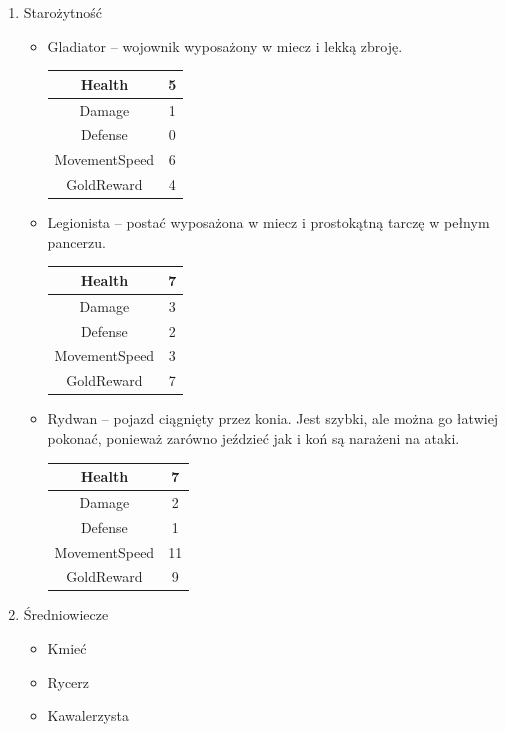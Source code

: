 \documentclass[a4paper,12pt, twoside, titlepage]{article}
\begin{document}
\begin{enumerate}
	\item Starożytność
	\begin{itemize} 
		\item Gladiator -- wojownik wyposażony w miecz i lekką zbroję.
		\begin{longtable}[l]{|c|c|} 
			\hline
			Health & 5 \\
			\hline
			Damage & 1 \\ 
			\hline 
			Defense & 0 \\ 
			\hline
			MovementSpeed & 6 \\ 
			\hline
			GoldReward & 4 \\ 
			\hline
		\end{longtable}
		
		\item Legionista -- postać wyposażona w miecz i prostokątną tarczę w pełnym pancerzu.
		\begin{longtable}[l]{|c|c|} 
			\hline
			Health & 7 \\
			\hline
			Damage & 3 \\ 
			\hline 
			Defense & 2 \\ 
			\hline
			MovementSpeed & 3 \\ 
			\hline
			GoldReward & 7 \\ 
			\hline
		\end{longtable}
		
		\item Rydwan -- pojazd ciągnięty przez konia. Jest szybki, ale można go łatwiej pokonać, ponieważ zarówno jeździeć jak i koń są narażeni na ataki.
		\begin{longtable}[l]{|c|c|} 
			\hline
			Health & 7 \\
			\hline
			Damage & 2 \\ 
			\hline 
			Defense & 1 \\ 
			\hline
			MovementSpeed & 11 \\ 
			\hline
			GoldReward & 9 \\ 
			\hline
		\end{longtable}
	\end{itemize}
	
	\item Średniowiecze
	\begin{itemize}
		\item Kmieć
		
		\item Rycerz
	
		\item Kawalerzysta
	\end{itemize}
\end{enumerate}
\end{document}
